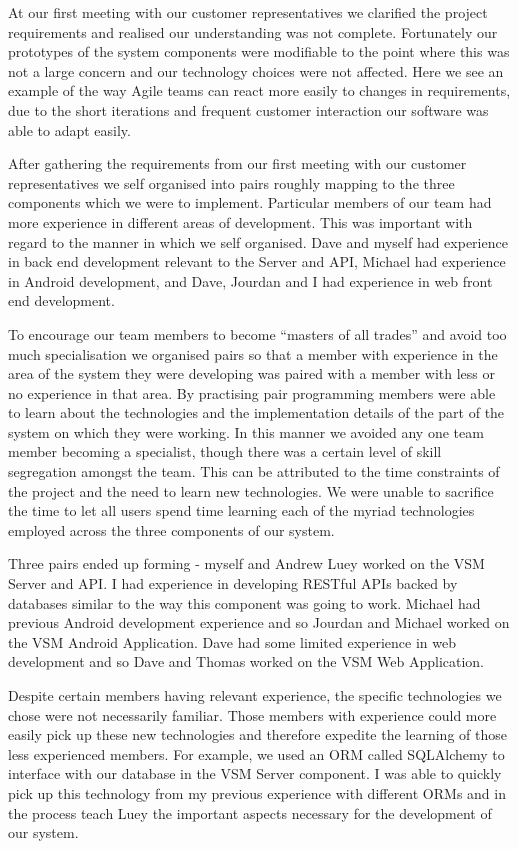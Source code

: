 \documentclass[conference]{IEEEtran}
\begin{document}
At our first meeting with our customer representatives we clarified the project
requirements and realised our understanding was not complete. Fortunately our
prototypes of the system components were modifiable to the point where this was
not a large concern and our technology choices were not affected. Here we see an
example of the way Agile teams can react more easily to changes in requirements,
due to the short iterations and frequent customer interaction our software was
able to adapt easily.

After gathering the requirements from our first meeting with our customer
representatives we self organised into pairs roughly mapping to the three
components which we were to implement. Particular members of our team had more
experience in different areas of development. This was important with regard to
the manner in which we self organised. Dave and myself had experience in back
end development relevant to the Server and API, Michael had experience in
Android development, and Dave, Jourdan and I had experience in web front end
development.

To encourage our team members to become ``masters of all trades'' and avoid too
much specialisation we organised pairs so that a member with experience in the
area of the system they were developing was paired with a member with less or no
experience in that area. By practising pair programming members were able to
learn about the technologies and the implementation details of the part of the
system on which they were working. In this manner we avoided any one team member
becoming a specialist, though there was a certain level of skill segregation
amongst the team. This can be attributed to the time constraints of the project
and the need to learn new technologies. We were unable to sacrifice the time to
let all users spend time learning each of the myriad technologies employed
across the three components of our system.

Three pairs ended up forming - myself and Andrew Luey worked on the VSM Server
and API. I had experience in developing RESTful APIs backed by databases similar
to the way this component was going to work. Michael had previous Android
development experience and so Jourdan and Michael worked on the VSM Android
Application. Dave had some limited experience in web development and so Dave and
Thomas worked on the VSM Web Application.

Despite certain members having relevant experience, the specific technologies we
chose were not necessarily familiar. Those members with experience could more
easily pick up these new technologies and therefore expedite the learning of
those less experienced members. For example, we used an ORM called SQLAlchemy to
interface with our database in the VSM Server component. I was able to quickly
pick up this technology from my previous experience with different ORMs and in
the process teach Luey the important aspects necessary for the development of
our system.
\end{document}
